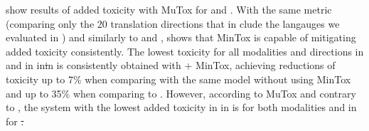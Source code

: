  show results of added toxicity with MuTox for \fleurs and \holisticbias.  With the same metric (comparing only the 20 translation directions that in clude the langauges we evaluated in ) and similarly to \etox and \asretox,  shows that MinTox is capable of mitigating added toxicity consistently. The lowest toxicity for all modalities and directions in \holisticbias and in \xeng in\st in \fleurs is consistently obtained with \mfourttwo + MinTox, achieving reductions of toxicity up to 7\% when comparing with the same model without using MinTox and up to 35\% when comparing to \mfourtlg.  However, according to MuTox and contrary to \etox, the system with the lowest added toxicity in \fleurs in \engx is \mfourtlg for both modalities and in \xeng for \st. %

